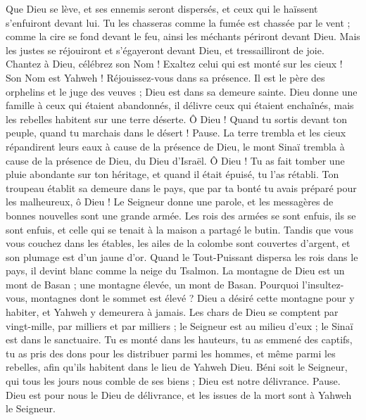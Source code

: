 \begin{multicols}{2}
Que Dieu se lève, et ses ennemis seront dispersés, et ceux qui le haïssent s'enfuiront devant lui.
Tu les chasseras comme la fumée est chassée par le vent ; comme la cire se fond devant le feu, ainsi les méchants périront devant Dieu.
Mais les justes se réjouiront et s'égayeront devant Dieu, et tressailliront de joie.
Chantez à Dieu, célébrez son Nom ! Exaltez celui qui est monté sur les cieux ! Son Nom est Yahweh ! Réjouissez-vous dans sa présence.
Il est le père des orphelins et le juge des veuves ; Dieu est dans sa demeure sainte.
Dieu donne une famille à ceux qui étaient abandonnés, il délivre ceux qui étaient enchaînés, mais les rebelles habitent sur une terre déserte.
Ô Dieu ! Quand tu sortis devant ton peuple, quand tu marchais dans le désert ! Pause.
La terre trembla et les cieux répandirent leurs eaux à cause de la présence de Dieu, le mont Sinaï trembla à cause de la présence de Dieu, du Dieu d'Israël.
Ô Dieu ! Tu as fait tomber une pluie abondante sur ton héritage, et quand il était épuisé, tu l'as rétabli.
Ton troupeau établit sa demeure dans le pays, que par ta bonté tu avais préparé pour les malheureux, ô Dieu !
Le Seigneur donne une parole, et les messagères de bonnes nouvelles sont une grande armée.
Les rois des armées se sont enfuis, ils se sont enfuis, et celle qui se tenait à la maison a partagé le butin.
Tandis que vous vous couchez dans les étables, les ailes de la colombe sont couvertes d'argent, et son plumage est d’un jaune d’or.
Quand le Tout-Puissant dispersa les rois dans le pays, il devint blanc comme la neige du Tsalmon.
La montagne de Dieu est un mont de Basan ; une montagne élevée, un mont de Basan.
Pourquoi l’insultez-vous, montagnes dont le sommet est élevé ? Dieu a désiré cette montagne pour y habiter, et Yahweh y demeurera à jamais.
Les chars de Dieu se comptent par vingt-mille, par milliers et par milliers ; le Seigneur est au milieu d'eux ; le Sinaï est dans le sanctuaire.
Tu es monté dans les hauteurs, tu as emmené des captifs, tu as pris des dons pour les distribuer parmi les hommes, et même parmi les rebelles, afin qu'ils habitent dans le lieu de Yahweh Dieu.
Béni soit le Seigneur, qui tous les jours nous comble de ses biens ; Dieu est notre délivrance. Pause.
Dieu est pour nous le Dieu de délivrance, et les issues de la mort sont à Yahweh le Seigneur.

\end{multicols}
